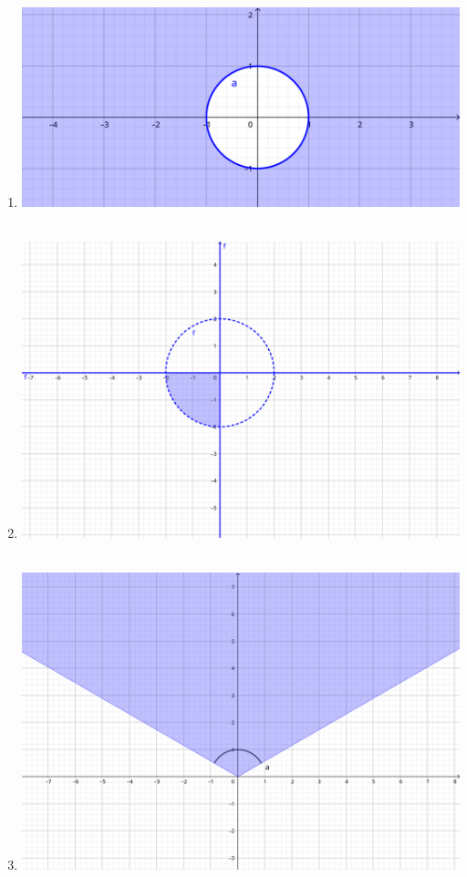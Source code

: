 \documentclass[../practica_02.tex]{subfiles}
\begin{document}
    \begin{enumerate}
        \item \includegraphics[scale=0.4]{ej03/resources/a.png} $ $
        \item \includegraphics[scale=0.4]{ej03/resources/b.png} $ $
        \item \includegraphics[scale=0.4]{ej03/resources/c.png} $ $
    \end{enumerate}
\end{document}
